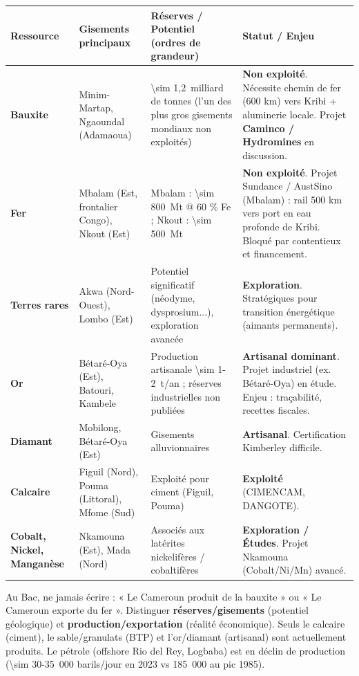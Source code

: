\documentclass[11pt]{article}
\begin{document}
\begin{center}
\begin{tabularx}{\linewidth}{|l|X|l|X|}
\hline
\rowcolor{popblueL} \textbf{Ressource} & \textbf{Gisements principaux} & \textbf{Réserves / Potentiel (ordres de grandeur)} & \textbf{Statut / Enjeu} \\
\hline
\textbf{Bauxite} & Minim-Martap, Ngaoundal (Adamaoua) & \SI{\sim 1,2}{milliard} de tonnes (l'un des plus gros gisements mondiaux non exploités) & \textbf{Non exploité}. Nécessite chemin de fer (600 km) vers Kribi + aluminerie locale. Projet \textbf{Caminco / Hydromines} en discussion. \\
\hline
\textbf{Fer} & Mbalam (Est, frontalier Congo), Nkout (Est) & Mbalam : \SI{\sim 800}{Mt} @ 60 \% Fe ; Nkout : \SI{\sim 500}{Mt} & \textbf{Non exploité}. Projet Sundance / AustSino (Mbalam) : rail 500 km vers port en eau profonde de Kribi. Bloqué par contentieux et financement. \\
\hline
\textbf{Terres rares} & Akwa (Nord-Ouest), Lombo (Est) & Potentiel significatif (néodyme, dysprosium...), exploration avancée & \textbf{Exploration}. Stratégiques pour transition énergétique (aimants permanents). \\
\hline
\textbf{Or} & Bétaré-Oya (Est), Batouri, Kambele & Production artisanale \SI{\sim 1-2}{t/an} ; réserves industrielles non publiées & \textbf{Artisanal dominant}. Projet industriel (ex. Bétaré-Oya) en étude. Enjeu : traçabilité, recettes fiscales. \\
\hline
\textbf{Diamant} & Mobilong, Bétaré-Oya (Est) & Gisements alluvionnaires & \textbf{Artisanal}. Certification Kimberley difficile. \\
\hline
\textbf{Calcaire} & Figuil (Nord), Pouma (Littoral), Mfome (Sud) & Exploité pour ciment (Figuil, Pouma) & \textbf{Exploité} (CIMENCAM, DANGOTE). \\
\hline
\textbf{Cobalt, Nickel, Manganèse} & Nkamouna (Est), Mada (Nord) & Associés aux latérites nickelifères / cobaltifères & \textbf{Exploration / Études}. Projet Nkamouna (Cobalt/Ni/Mn) avancé. \\
\hline
\end{tabularx}
\end{center}

\begin{attention}
Au Bac, ne jamais écrire : « Le Cameroun produit de la bauxite » ou « Le Cameroun exporte du fer ». Distinguer \textbf{réserves/gisements} (potentiel géologique) et \textbf{production/exportation} (réalité économique). Seuls le calcaire (ciment), le sable/granulats (BTP) et l'or/diamant (artisanal) sont actuellement produits. Le pétrole (offshore Rio del Rey, Logbaba) est en déclin de production (\SI{\sim 30-35}{000} barils/jour en 2023 vs \SI{185}{000} au pic 1985).
\end{attention}
\end{document}
